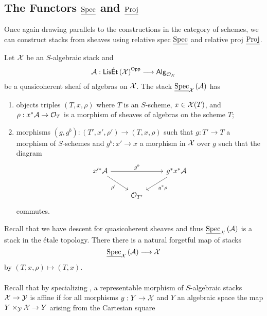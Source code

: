 \subsection{The Functors $\operatorname{\underline{Spec}}$ and $\operatorname{\underline{Proj}}$}
Once again drawing parallels to the constructions in the category of schemes, we can construct stacks from sheaves using relative spec $\operatorname{\underline{Spec}}$ and relative proj $\operatorname{\underline{Proj}}$. 
\begin{definition}
    Let $\mathcal{X}$ be an $S$-algebraic stack and 
    $$\mathcal{A}:\mathsf{Lis\acute{E}t}\left(\mathcal{X}\right)^{\mathsf{Opp}}\longrightarrow\mathsf{Alg}_{\mathcal{O}_{\mathcal{X}}}$$
    be a quasicoherent sheaf of algebras on $\mathcal{X}$. The stack $\operatorname{\underline{Spec}}_{\mathcal{X}}\left(\mathcal{A}\right)$ has 
    \begin{enumerate}[label=(\alph*)]
        \item objects triples $(T,x,\rho)$ where $T$ is an $S$-scheme, $x\in\mathcal{X}(T)$, and $\rho:x^{*}\mathcal{A}\to\mathcal{O}_{T}$ is a morphism of sheaves of algebras on the scheme $T$;
        \item morphisms $(g,g^{b}):(T',x',\rho')\to(T,x,\rho)$ such that $g:T'\to T$ a morphism of $S$-schemes and $g^{b}:x'\to x$ a morphism in $\mathcal{X}$ over $g$ such that the diagram 
        $$%
        \begin{tikzcd}
            {x'^{*}\Acal} && {g^{*}x^{*}\Acal} \\
            & {\Ocal_{T'}}
            \arrow["{g^{b}}", from=1-1, to=1-3]
            \arrow["{\rho'}"', from=1-1, to=2-2]
            \arrow["{g^{*}\rho}", from=1-3, to=2-2]
        \end{tikzcd}$$
        commutes. 
    \end{enumerate}
\end{definition}
Recall that we have descent for quasicoherent sheaves and thus $\operatorname{\underline{Spec}}_{\mathcal{X}}\left(\mathcal{A}\right)$ is a stack in the \'{e}tale topology. There there is a natural forgetful map of stacks
$$\operatorname{\underline{Spec}}_{\mathcal{X}}\left(\mathcal{A}\right)\longrightarrow\mathcal{X}$$
by $(T,x,\rho)\mapsto(T,x)$. 
\\\\
Recall that by specializing , a representable morphism of $S$-algebraic stacks $\mathcal{X}\to\mathcal{Y}$ is affine if for all morphisms $y:Y\to\mathcal{X}$ and $Y$ an algebraic space the map $Y\times_{\mathcal{Y}}\mathcal{X}\to Y$ arising from the Cartesian square 
